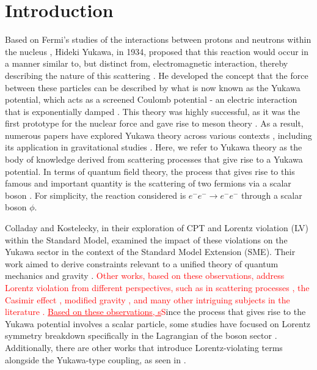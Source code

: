 \documentclass[11pt,showpacs,preprintnumbers,amsmath,amssymb,prd,nofootinbib,superscriptaddress]{revtex4-2}
\begin{document}
\section{Introduction}

Based on Fermi's studies of the interactions between protons and neutrons within the nucleus \cite{fermi}, Hideki Yukawa, in 1934, proposed that this reaction would occur in a manner similar to, but distinct from, electromagnetic interaction, thereby describing the nature of this scattering \cite{yukawa}. He developed the concept that the force between these particles can be described by what is now known as the Yukawa potential, which acts as a screened Coulomb potential - an electric interaction that is exponentially damped \cite{screened1, screened2}. This theory was highly successful, as it was the first prototype for the nuclear force and gave rise to meson theory \cite{nambuyukawa}. As a result, numerous papers have explored Yukawa theory across various contexts \cite{refyuk1, refyuk2, refyuk3, refyuk4}, including its application in gravitational studies \cite{yukawagravity}. Here, we refer to Yukawa theory as the body of knowledge derived from scattering processes that give rise to a Yukawa potential. In terms of quantum field theory, the process that gives rise to this famous and important quantity is the scattering of two fermions via a scalar boson \cite{peskin, ryder}. For simplicity, the reaction considered is $e^{-}e^{-} \to e^{-}e^{-}$ through a scalar boson $\phi$.

Colladay and Kostelecky, in their exploration of CPT and Lorentz violation (LV) within the Standard Model, examined the impact of these violations on the Yukawa sector in the context of the Standard Model Extension (SME). Their work aimed to derive constraints relevant to a unified theory of quantum mechanics and gravity \textcolor{red}{\cite{kostelecky1, kostelecky2, kosteleckycs, kostelecky2004gravity}}. \textcolor{red}{Other works, based on these observations, address Lorentz violation from different perspectives, such as in scattering processes \cite{scatter1, scatter3, cabral2023violation, santos2020gravitational}, the Casimir effect \cite{santos2019lorentz, ferreira2022tfd, santos2022corrections}, modified gravity \cite{jesus2020godel, santos2015godel, jesus2019ricci}, and many other intriguing subjects in the literature \cite{aguirrelorentz, araujo2021thermodynamic, aa2021lorentz, filho2021thermal, araujo2021higher}. \underline{Based on these observations, s}S}ince the process that gives rise to the Yukawa potential involves a scalar particle, some studies have focused on Lorentz symmetry breakdown specifically in the Lagrangian of the boson sector \cite{altschul}. Additionally, there are other works that introduce Lorentz-violating terms alongside the Yukawa-type coupling, as seen in \cite{mmferreira}.
\end{document}
